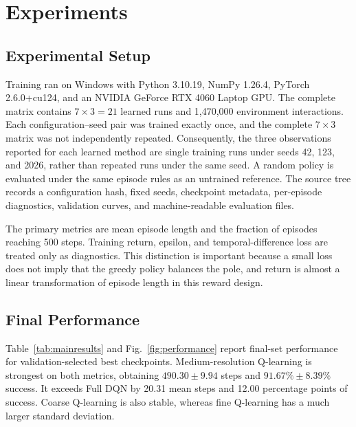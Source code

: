 \documentclass[conference]{IEEEtran}
\begin{document}
\section{Experiments}

\subsection{Experimental Setup}

Training ran on Windows with Python 3.10.19, NumPy 1.26.4, PyTorch
2.6.0+cu124, and an NVIDIA GeForce RTX 4060 Laptop GPU. The complete matrix
contains $7\times3=21$ learned runs and 1,470,000 environment interactions.
Each configuration--seed pair was trained exactly once, and the complete
$7\times3$ matrix was not independently repeated. Consequently, the three
observations reported for each learned method are single training runs under
seeds 42, 123, and 2026, rather than repeated runs under the same seed.
A random policy is evaluated under the same episode rules as an untrained
reference. The source tree records a configuration hash, fixed seeds,
checkpoint metadata, per-episode diagnostics, validation curves, and
machine-readable evaluation files.

The primary metrics are mean episode length and the fraction of episodes
reaching 500 steps. Training return, epsilon, and temporal-difference loss are
treated only as diagnostics. This distinction is important because a small
loss does not imply that the greedy policy balances the pole, and return is
almost a linear transformation of episode length in this reward design.

\subsection{Final Performance}

Table~\ref{tab:mainresults} and Fig.~\ref{fig:performance} report final-set
performance for validation-selected best checkpoints. Medium-resolution
Q-learning is strongest on both metrics, obtaining
$490.30\pm9.94$ steps and $91.67\%\pm8.39\%$ success. It exceeds Full DQN by
20.31 mean steps and 12.00 percentage points of success. Coarse Q-learning is
also stable, whereas fine Q-learning has a much larger standard deviation.
\end{document}

